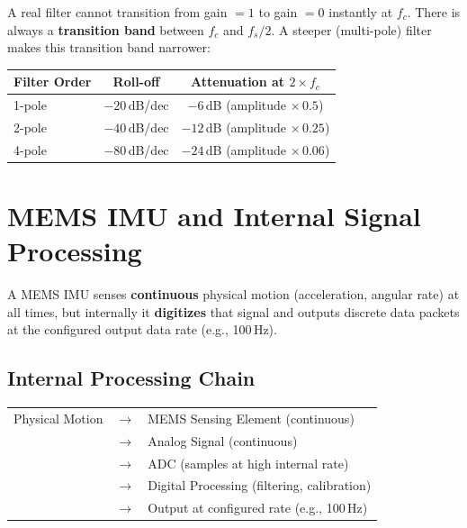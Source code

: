 \documentclass[12pt,a4paper]{article}
\begin{document}
A real filter cannot transition from gain $= 1$ to gain $= 0$ instantly at $f_c$. There is always a \textbf{transition band} between $f_c$ and $f_s/2$. A steeper (multi-pole) filter makes this transition band narrower:

\begin{center}
\begin{tabular}{lcc}
    \toprule
    \textbf{Filter Order} & \textbf{Roll-off} & \textbf{Attenuation at $2 \times f_c$} \\
    \midrule
    1-pole & $-20$\,dB/dec & $-6$\,dB (amplitude $\times\,0.5$) \\
    2-pole & $-40$\,dB/dec & $-12$\,dB (amplitude $\times\,0.25$) \\
    4-pole & $-80$\,dB/dec & $-24$\,dB (amplitude $\times\,0.06$) \\
    \bottomrule
\end{tabular}
\end{center}

\section{MEMS IMU and Internal Signal Processing}

A MEMS IMU senses \textbf{continuous} physical motion (acceleration, angular rate) at all times, but internally it \textbf{digitizes} that signal and outputs discrete data packets at the configured output data rate (e.g., 100\,Hz).

\subsection{Internal Processing Chain}

\begin{center}
\begin{tabular}{rcl}
    Physical Motion & $\longrightarrow$ & MEMS Sensing Element (continuous) \\
    & $\longrightarrow$ & Analog Signal (continuous) \\
    & $\longrightarrow$ & ADC (samples at high internal rate) \\
    & $\longrightarrow$ & Digital Processing (filtering, calibration) \\
    & $\longrightarrow$ & Output at configured rate (e.g., 100\,Hz) \\
\end{tabular}
\end{center}
\end{document}
